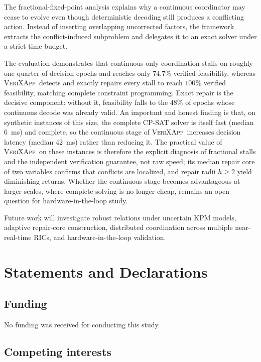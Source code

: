 \documentclass[pdflatex,sn-mathphys-num,iicol,oneside]{sn-jnl}
\newcommand{\method}{\textsc{VeriXApp}}
\begin{document}
The fractional-fixed-point analysis explains why a continuous
coordinator may cease to evolve even though deterministic decoding
still produces a conflicting action. Instead of inserting overlapping
uncorrected factors, the framework extracts the conflict-induced
subproblem and delegates it to an exact solver under a strict time
budget.

The evaluation demonstrates that continuous-only coordination stalls on
roughly one quarter of decision epochs and reaches only $74.7\%$ verified
feasibility, whereas \method\ detects and exactly repairs every stall to
reach $100\%$ verified feasibility, matching complete constraint
programming. Exact repair is the decisive component: without it, feasibility
falls to the $48\%$ of epochs whose continuous decode was already valid. An
important and honest finding is that, on synthetic instances of this size,
the complete CP-SAT solver is itself fast (median $6$~ms) and complete, so
the continuous stage of \method\ increases decision latency (median
$42$~ms) rather than reducing it. The practical value of \method\ on these
instances is therefore the explicit diagnosis of fractional stalls and the
independent verification guarantee, not raw speed; its median repair core of
two variables confirms that conflicts are localized, and repair radii
$h \geq 2$ yield diminishing returns. Whether the continuous stage becomes
advantageous at larger scales, where complete solving is no longer cheap,
remains an open question for hardware-in-the-loop study.

Future work will investigate robust relations under uncertain KPM
models, adaptive repair-core construction, distributed coordination
across multiple near-real-time RICs, and hardware-in-the-loop
validation.

\section*{Statements and Declarations}

\subsection*{Funding}

No funding was received for conducting this study.

\subsection*{Competing interests}
\end{document}

